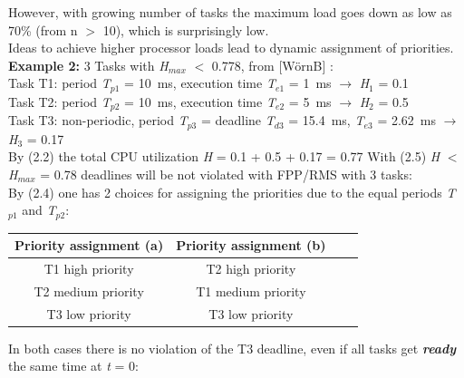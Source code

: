 However, with growing number of tasks the maximum load goes down as low as 70\% (from n $\mathrm{>}$ 10), which is surprisingly low.\\

Ideas to achieve higher processor loads lead to dynamic assignment of priorities.\\

 \textbf{Example 2:} 3 Tasks with \textit{H}${}_{max}$ $\mathrm{<}$ 0.778, from [W\"{o}rnB] :\\
Task T1: period \textit{T}${}_{p1}$ = 10~ms, execution time \textit{T}${}_{e1}$ = 1~ms  $\rightarrow$ \textit{H}${}_{1}$ = 0.1\\
Task T2: period \textit{T}${}_{p2}$ = 10~ms, execution time\textit{ T}${}_{e2}$ = 5~ms  $\rightarrow$ \textit{H}${}_{2}$ = 0.5\\
Task T3: non-periodic, period \textit{T}${}_{p3}$ = deadline \textit{T}${}_{d3}$ = 15.4~ms, \textit{T}${}_{e3}$ = 2.62~ms  $\rightarrow$ \textit{H}${}_{3}$ = 0.17\\

By (2.2) the total CPU utilization \textit{H} = 0.1 + 0.5 + 0.17 = 0.77 With (2.5) \textit{H} $\mathrm{<}$ \textit{H}${}_{max}$ = 0.78 deadlines will be not violated with FPP/RMS with 3 tasks:\\

By (2.4) one has 2 choices for assigning the priorities due to the equal periods \textit{T}${}_{p1}$\textit{ }and \textit{T}${}_{p2}$:

\begin{table}[h!]
\setlength{\tabcolsep}{10pt} %
\renewcommand{\arraystretch}{1.5} %
\small
\centering
 \begin{tabular}{|c|c|c|c|} 
 \hline
 \textbf{Priority assignment (a)} & \textbf{Priority assignment (b)} \\ [0.1ex] 
 \hline
 T1  high priority & T2  high  priority \\ 
 \hline
 T2  medium priority & T1  medium priority \\ 
  \hline
 T3  low priority & T3  low priority  \\ 
 \hline
 \end{tabular}
 \label{Intrinsic}
\end{table}

In both cases there is no violation of the T3 deadline, even if all tasks get \textbf{\textit{ready}} the same time at \textit{t} = 0: 
	
